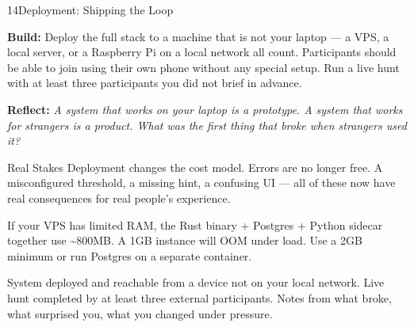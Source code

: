 \documentclass[
  11pt,
  oneside,
  DIV=12,
]{scrartcl}
\newcommand{\build}[1]{\textbf{\color{SpringMoss}Build:} #1}
\newcommand{\reflect}[1]{\textbf{\color{ConceptBlue}Reflect:} \textit{#1}}
\begin{document}
\begin{milestone}{14}{Deployment: Shipping the Loop}

\build{Deploy the full stack to a machine that is not your laptop —
a VPS, a local server, or a Raspberry Pi on a local network all count.
Participants should be able to join using their own phone without any
special setup. Run a live hunt with at least three participants you did
not brief in advance.}

\medskip
\reflect{A system that works on your laptop is a prototype. A system that
works for strangers is a product. What was the first thing that broke when
strangers used it?}

\begin{hitlconcept}{Real Stakes}
  Deployment changes the cost model. Errors are no longer free. A
  misconfigured threshold, a missing hint, a confusing UI — all of these
  now have real consequences for real people's experience.
\end{hitlconcept}

\begin{watchout}
  If your VPS has limited RAM, the Rust binary + Postgres + Python sidecar
  together use \textasciitilde 800MB. A 1GB instance will OOM under load.
  Use a 2GB minimum or run Postgres on a separate container.
\end{watchout}

\begin{checkpoint}
  System deployed and reachable from a device not on your local network.
  Live hunt completed by at least three external participants.
  Notes from what broke, what surprised you, what you changed under pressure.
\end{checkpoint}

\end{milestone}
\end{document}
